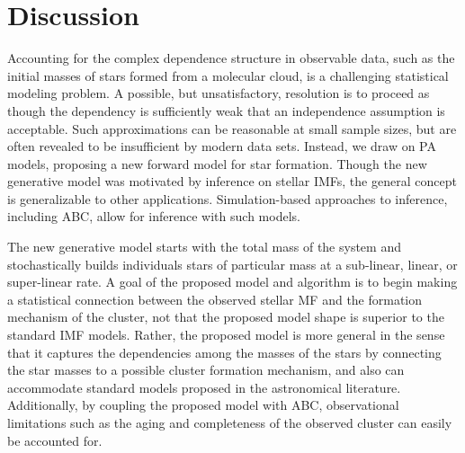 \documentclass[ejs]{imsart}
\numberwithin{equation}{section}
\theoremstyle{plain}
\begin{document}
\section{Discussion}
\label{discussionSec}

Accounting for the complex dependence structure in observable data, such as the initial masses of stars formed from a molecular cloud, 
is a challenging statistical modeling problem.  A possible, but unsatisfactory, resolution is to proceed as though the dependency 
is sufficiently weak that an independence assumption is acceptable. Such approximations can be reasonable at small sample sizes, but
are often revealed to be insufficient by modern data sets.
Instead, we draw on PA models, proposing a new forward model for star formation.
Though the new generative model was motivated by inference on stellar IMFs, the general concept is
generalizable to other applications. Simulation-based approaches to inference, including ABC, allow for inference
with such models.

The new generative model starts with the total mass of the system and stochastically builds individuals stars of particular mass at a sub-linear, linear, or super-linear rate.  
%
A goal of the proposed model and algorithm is to begin making a statistical connection between the observed stellar MF and the formation mechanism of the cluster, not that the proposed model shape is superior to the standard IMF models.  Rather, the proposed model is more general in the sense that it 
captures the dependencies among the masses of the stars by connecting the star masses to a possible cluster formation mechanism, and also can accommodate standard models proposed in the astronomical literature.
Additionally, by coupling the proposed model with ABC, observational limitations such as the aging and completeness of the observed cluster can easily be accounted for.
\end{document}
